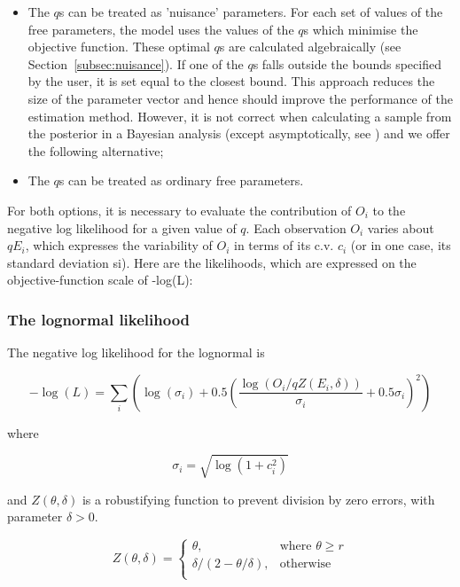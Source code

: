 \begin{itemize}
	\item The $q$s can be treated as 'nuisance' parameters. For each set of values of the free parameters, the model uses the values of the $q$s which minimise the objective function. These optimal $q$s are calculated algebraically (see Section~\ref{subsec:nuisance}). If one of the $q$s falls outside the bounds specified by the user, it is set equal to the closest bound. This approach reduces the size of the parameter vector and hence should improve the performance of the estimation method. However, it is not correct when calculating a sample from the posterior in a Bayesian analysis (except asymptotically, see \cite{Walters_ludwig_94}) and we offer the following alternative;

	\item The $q$s can be treated as ordinary free parameters.
\end{itemize}

For both options, it is necessary to evaluate the contribution of $O_i$ to the negative log likelihood for a given value of $q$. Each observation $O_i$ varies about $qE_i$, which expresses the variability of $O_i$ in terms of its c.v. $c_i$ (or in one case, its standard deviation si). Here are the likelihoods, which are expressed on the objective-function scale of -log(L):

\subsubsection*{The lognormal likelihood}

The negative log likelihood for the lognormal is

\begin{equation}
- \log \left(L \right) = \sum\limits_i \left( \log \left( \sigma _i \right) + 0.5\left( \frac{\log \left(O_i / q Z \left(E_i,\delta \right) \right)}{\sigma_i} + 0.5 \sigma_i \right)^2 \right)
\end{equation}

where

\begin{equation}
\sigma_i  = \sqrt{\log \left(1+c_i^2 \right)}
\end{equation}

and $Z \left(\theta,\delta \right)$ is a robustifying function to prevent division by zero errors, with parameter $\delta>0$.

\begin{equation}
Z \left(\theta,\delta \right) = \begin{cases}
\theta, & \text{where $\theta \ge r$} \\
\delta/\left( 2-\theta/\delta \right), & \text{otherwise} \\
\end{cases}
\end{equation}

